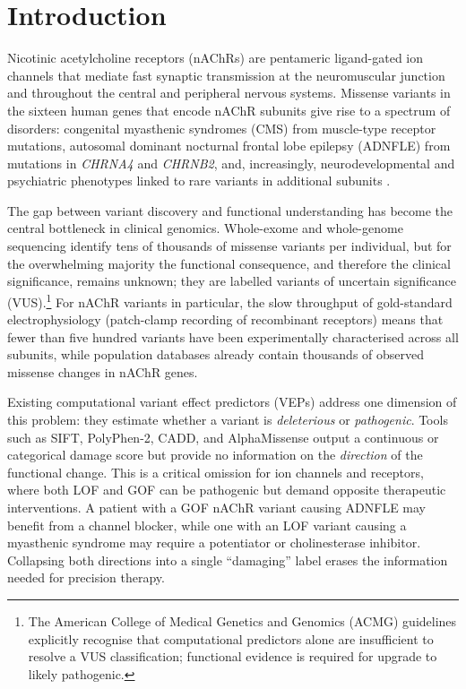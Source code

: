 \documentclass{ws-procs11x85}
\begin{document}
\section{Introduction}\label{sec:intro}

Nicotinic acetylcholine receptors (nAChRs) are pentameric ligand-gated
ion channels that mediate fast synaptic transmission at the neuromuscular
junction and throughout the central and peripheral nervous systems.
Missense variants in the sixteen human genes that encode nAChR subunits
give rise to a spectrum of disorders: congenital myasthenic syndromes
(CMS) from muscle-type receptor mutations, autosomal dominant nocturnal
frontal lobe epilepsy (ADNFLE) from mutations in \emph{CHRNA4} and
\emph{CHRNB2}, and, increasingly, neurodevelopmental and psychiatric
phenotypes linked to rare variants in additional subunits
\cite{schaaf2011, cms_review}.

The gap between variant discovery and functional understanding has
become the central bottleneck in clinical genomics. Whole-exome and
whole-genome sequencing identify tens of thousands of missense variants
per individual, but for the overwhelming majority the functional
consequence, and therefore the clinical significance, remains unknown;
they are labelled variants of uncertain significance (VUS).\footnote{The
American College of Medical Genetics and Genomics (ACMG) guidelines
explicitly recognise that computational predictors alone are insufficient
to resolve a VUS classification; functional evidence is required for
upgrade to likely pathogenic.}  For nAChR variants in particular, the
slow throughput of gold-standard electrophysiology (patch-clamp recording
of recombinant receptors) means that fewer than five hundred variants
have been experimentally characterised across all subunits, while
population databases already contain thousands of observed missense
changes in nAChR genes.

Existing computational variant effect predictors (VEPs) address one
dimension of this problem: they estimate whether a variant is
\emph{deleterious} or \emph{pathogenic}. Tools such as SIFT,
PolyPhen-2, CADD, and AlphaMissense \cite{sift,polyphen2,cadd,alphamissense}
output a continuous or categorical damage score but provide no
information on the \emph{direction} of the functional change. This is a
critical omission for ion channels and receptors, where both LOF and GOF
can be pathogenic but demand opposite therapeutic interventions. A
patient with a GOF nAChR variant causing ADNFLE may benefit from a
channel blocker, while one with an LOF variant causing a myasthenic
syndrome may require a potentiator or cholinesterase inhibitor.
Collapsing both directions into a single ``damaging'' label erases the
information needed for precision therapy.
\end{document}
